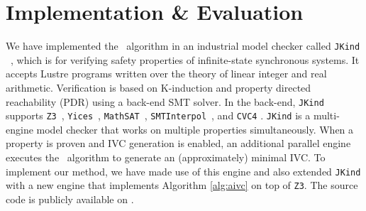 \section{Implementation \& Evaluation}
\label{sec:impl}

We have implemented the \aivcalg ~algorithm
in an industrial model checker called \texttt{JKind} ~\cite{jkind},
which is for verifying safety properties of  infinite-state synchronous systems.
It accepts Lustre programs \cite{Halbwachs91:lustre}
written over the theory of linear integer and real arithmetic.
Verification is based on K-induction and property directed reachability (PDR) using a back-end SMT solver.
In the
back-end, \texttt{JKind} supports \texttt{Z3}~\cite{DeMoura08:z3},
\texttt{Yices}~\cite{Dutertre06:yices}, \texttt{MathSAT}~\cite{Cimatti2013:MathSAT},
\texttt{SMTInterpol}~\cite{Christ2012:SMTInterpol}, and \texttt{CVC4} \cite{barrett2011cvc4}. \texttt{JKind} is a multi-engine model checker that works on multiple properties simultaneously. When a property is
proven and IVC generation is enabled, an additional parallel engine
executes the \ucalg ~algorithm \cite{Ghass16} to generate an (approximately) minimal IVC. To implement our method, we have made use of this engine and also extended \texttt{JKind} with a new engine that
implements Algorithm \ref{alg:aivc} on top of \texttt{Z3}.
The source code is publicly available on \cite{mygit}.



%

 